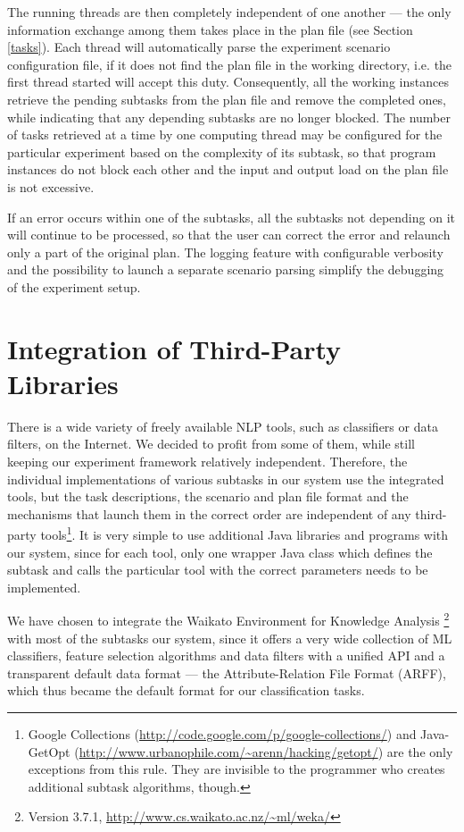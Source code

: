 \documentclass[12pt,notitlepage]{report}
\begin{document}
The running threads are then completely independent of one another --- the only information exchange among them takes place in the plan file (see Section \ref{tasks}). Each thread will automatically parse the experiment scenario configuration file, if it does not find the plan file in the working directory, i.e. the first thread started will accept this duty. Consequently, all the working instances retrieve the pending subtasks from the plan file and remove the completed ones, while indicating that any depending subtasks are no longer blocked. The number of tasks retrieved at a time by one computing thread may be configured for the particular experiment based on the complexity of its subtask, so that program instances do not block each other and the input and output load on the plan file is not excessive.

If an error occurs within one of the subtasks, all the subtasks not depending on it will continue to be processed, so that the user can correct the error and relaunch only a part of the original plan. The logging feature with configurable verbosity and the possibility to launch a separate scenario parsing simplify the debugging of the experiment setup.

\section{Integration of Third-Party Libraries}\label{weka}

There is a wide variety of freely available NLP tools, such as classifiers or data filters, on the Internet. We decided to profit from some of them, while still keeping our experiment framework relatively independent. Therefore, the individual implementations of various subtasks in our system use the integrated tools, but the task descriptions, the scenario and plan file format and the mechanisms that launch them in the correct order are independent of any third-party tools\footnote{Google Collections (\url{http://code.google.com/p/google-collections/}) and Java-GetOpt (\url{http://www.urbanophile.com/\~arenn/hacking/getopt/}) are the only exceptions from this rule. They are invisible to the programmer who creates additional subtask algorithms, though.}. It is very simple to use additional Java libraries and programs with our system, since for each tool, only one wrapper Java class which defines the subtask and calls the particular tool with the correct parameters needs to be implemented.

We have chosen to integrate the Waikato Environment for Knowledge Analysis \citep[WEKA, ][]{garner95}\footnote{Version 3.7.1, \url{http://www.cs.waikato.ac.nz/~ml/weka/}} with most of the subtasks our system, since it offers a very wide collection of ML classifiers, feature selection algorithms and data filters with a unified API and a transparent default data format --- the Attribute-Relation File Format (ARFF), which thus became the default format for our classification tasks.
\end{document}
